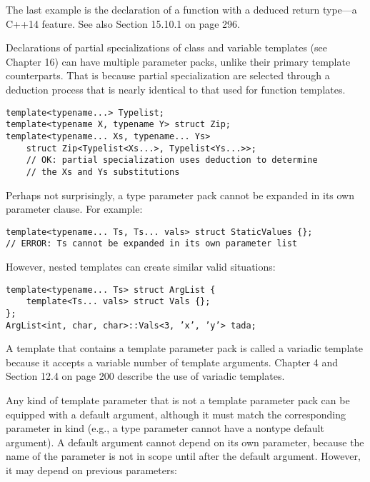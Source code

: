 The last example is the declaration of a function with a deduced return type—a C++14 feature. See also Section 15.10.1 on page 296.

Declarations of partial specializations of class and variable templates (see Chapter 16) can have multiple parameter packs, unlike their primary template counterparts. That is because partial specialization are selected through a deduction process that is nearly identical to that used for function templates.

\begin{lstlisting}[style=styleCXX]
template<typename...> Typelist;
template<typename X, typename Y> struct Zip;
template<typename... Xs, typename... Ys>
	struct Zip<Typelist<Xs...>, Typelist<Ys...>>;
	// OK: partial specialization uses deduction to determine
	// the Xs and Ys substitutions
\end{lstlisting}

Perhaps not surprisingly, a type parameter pack cannot be expanded in its own parameter clause. For example:

\begin{lstlisting}[style=styleCXX]
template<typename... Ts, Ts... vals> struct StaticValues {};
// ERROR: Ts cannot be expanded in its own parameter list
\end{lstlisting}

However, nested templates can create similar valid situations:

\begin{lstlisting}[style=styleCXX]
template<typename... Ts> struct ArgList {
	template<Ts... vals> struct Vals {};
};
ArgList<int, char, char>::Vals<3, ’x’, ’y’> tada;
\end{lstlisting}

A template that contains a template parameter pack is called a variadic template because it accepts a variable number of template arguments. Chapter 4 and Section 12.4 on page 200 describe the use of variadic templates.


Any kind of template parameter that is not a template parameter pack can be equipped with a default argument, although it must match the corresponding parameter in kind (e.g., a type parameter cannot have a nontype default argument). A default argument cannot depend on its own parameter, because the name of the parameter is not in scope until after the default argument. However, it may depend on previous parameters:

